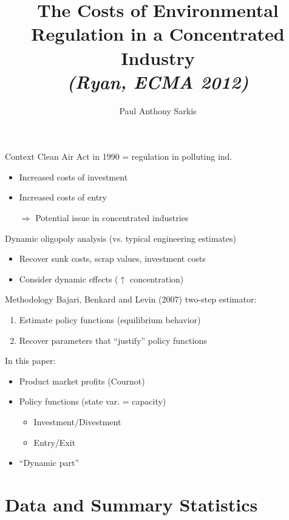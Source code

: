 \documentclass[12pt]{beamer}
\author{Paul Anthony Sarkis}
\title{The Costs of Environmental Regulation
in a Concentrated Industry \\
\textit{(Ryan, ECMA 2012)}}
\begin{document}
\begin{frame}
\titlepage
\end{frame}

\begin{frame}{Context}
Clean Air Act in 1990 = regulation in polluting ind.\begin{itemize}
\item Increased costs of investment
\item Increased costs of entry
\item[$\Rightarrow$] Potential issue in concentrated industries
\item[]
\end{itemize}
Dynamic oligopoly analysis (vs. typical engineering estimates)
\begin{itemize}
\item Recover sunk costs, scrap values, investment costs
\item Consider dynamic effects ($\uparrow$ concentration)
\end{itemize}
\end{frame}

\begin{frame}{Methodology}
Bajari, Benkard and Levin (2007) two-step estimator:
\begin{enumerate}
\item Estimate policy functions (equilibrium behavior)
\item Recover parameters that ``justify'' policy functions
\item[]
\end{enumerate}
In this paper:
\begin{itemize}
\item Product market profits (Cournot)
\item Policy functions (state var. = capacity)
\begin{itemize}
\item Investment/Divestment
\item Entry/Exit
\end{itemize}
\item ``Dynamic part''
\end{itemize}
\end{frame}

\section{Data and Summary Statistics}
\end{document}
